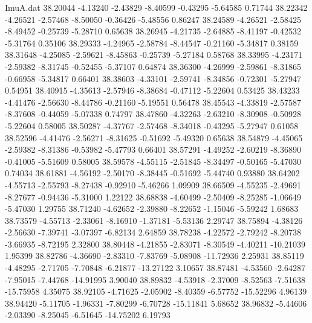 \begin{filecontents}{ImuA.dat}
  38.20044   -4.13240   -2.43829   -8.40599   -0.43295   -5.64585    0.71744
  38.22342   -4.26521   -2.57468   -8.50050   -0.36426   -5.48556    0.86247
  38.24589   -4.26521   -2.58425   -8.49452   -0.25739   -5.28710    0.65638
  38.26945   -4.21735   -2.64885   -8.41197   -0.42532   -5.31764    0.35106
  38.29333   -4.24965   -2.58784   -8.44547   -0.21160   -5.34817    0.38159
  38.31648   -4.25085   -2.59621   -8.45863   -0.25739   -5.27184    0.58768
  38.33995   -4.23171   -2.59382   -8.31745   -0.52455   -5.37107    0.64874
  38.36300   -4.26999   -2.59861   -8.31865   -0.66958   -5.34817    0.66401
  38.38603   -4.33101   -2.59741   -8.34856   -0.72301   -5.27947    0.54951
  38.40915   -4.35613   -2.57946   -8.38684   -0.47112   -5.22604    0.53425
  38.43233   -4.41476   -2.56630   -8.44786   -0.21160   -5.19551    0.56478
  38.45543   -4.33819   -2.57587   -8.37608   -0.44059   -5.07338    0.74797
  38.47860   -4.32263   -2.63210   -8.30908   -0.50928   -5.22604    0.58005
  38.50287   -4.37767   -2.57468   -8.34018   -0.43295   -5.27947    0.61058
  38.52596   -4.41476   -2.56271   -8.31625   -0.51692   -5.49320    0.65638
  38.54879   -4.45065   -2.59382   -8.31386   -0.53982   -5.47793    0.66401
  38.57291   -4.49252   -2.60219   -8.36890   -0.41005   -5.51609    0.58005
  38.59578   -4.55115   -2.51845   -8.34497   -0.50165   -5.47030    0.74034
  38.61881   -4.56192   -2.50170   -8.38445   -0.51692   -5.44740    0.93880
  38.64202   -4.55713   -2.55793   -8.27438   -0.92910   -5.46266    1.09909
  38.66509   -4.55235   -2.49691   -8.27677   -0.94436   -5.31000    1.22122
  38.68838   -4.60499   -2.50409   -8.25285   -1.06649   -5.47030    1.29755
  38.71240   -4.62652   -2.39880   -8.22652   -1.15046   -5.59242    1.68683
  38.73579   -4.55713   -2.33061   -8.16910   -1.37181   -5.53136    2.29747
  38.75894   -4.38126   -2.56630   -7.39741   -3.07397   -6.82134    2.64859
  38.78238   -4.22572   -2.79242   -8.20738   -3.66935   -8.72195    2.32800
  38.80448   -4.21855   -2.83071   -8.30549   -4.40211  -10.21039    1.95399
  38.82786   -4.36690   -2.83310   -7.83769   -5.08908  -11.72936    2.25931
  38.85119   -4.48295   -2.71705   -7.70848   -6.21877  -13.27122    3.10657
  38.87481   -4.53560   -2.64287   -7.95015   -7.44768  -14.91995    3.90040
  38.89832   -4.53918   -2.37009   -8.52563   -7.51638  -15.75958    4.35075
  38.92105   -4.71625   -2.05902   -8.40359   -6.57752  -15.52296    4.96139
  38.94420   -5.11705   -1.96331   -7.80299   -6.70728  -15.11841    5.68652
  38.96832   -5.44606   -2.03390   -8.25045   -6.51645  -14.75202    6.19793

\end{filecontents}
